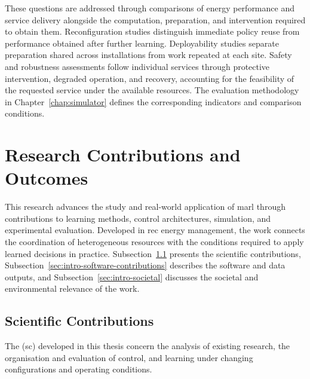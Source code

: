 These questions are addressed through comparisons of energy performance and service delivery alongside the computation, preparation, and intervention required to obtain them. Reconfiguration studies distinguish immediate policy reuse from performance obtained after further learning. Deployability studies separate preparation shared across installations from work repeated at each site. Safety and robustness assessments follow individual services through protective intervention, degraded operation, and recovery, accounting for the feasibility of the requested service under the available resources. The evaluation methodology in Chapter~\ref{chap:simulator} defines the corresponding indicators and comparison conditions.

\section{Research Contributions and Outcomes}
\label{sec:intro-contributions}

This research advances the study and real-world application of \gls{marl} through contributions to learning methods, control architectures, simulation, and experimental evaluation. Developed in \gls{rec} energy management, the work connects the coordination of heterogeneous resources with the conditions required to apply learned decisions in practice. Subsection~\ref{sec:intro-scientific-contributions} presents the scientific contributions, Subsection~\ref{sec:intro-software-contributions} describes the software and data outputs, and Subsection~\ref{sec:intro-societal} discusses the societal and environmental relevance of the work.

\subsection{Scientific Contributions}
\label{sec:intro-scientific-contributions}

The  (\acrshort{sc}) developed in this thesis concern the analysis of existing research, the organisation and evaluation of control, and learning under changing configurations and operating conditions.

